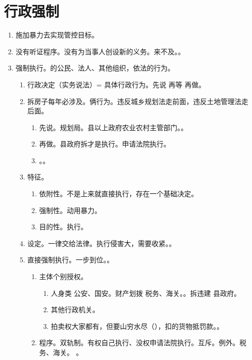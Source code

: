 \section{行政强制}
\begin{enumerate}
  \item 施加暴力去实现管控目标。
  \item 没有听证程序。\yi 没有为当事人创设新的义务。\er 来不及。。
  \item 强制执行。的公民、法人、其他组织，依法的行为。
        \begin{enumerate}
          \item 行政决定（实务说法）= 具体行政行为。先说 \yjt 再等 \yjt 再做。
          \item 拆房子每年必涉及。俩行为。违反城乡规划法走前面，违反土地管理法走后面。
                \begin{enumerate}
                  \item 先说。规划局。县以上政府农业农村主管部门。。
                  \item 再做。县政府拆才是执行。申请法院执行。
                  \item {}。。
                \end{enumerate}
          \item 特征。
                \begin{enumerate}
                  \item 依附性。不是上来就直接执行，存在一个基础决定。
                  \item 强制性。动用暴力。
                  \item 目的性。执行。
                \end{enumerate}
          \item 设定。一律交给法律。执行侵害大，需要收紧。。
          \item 直接强制执行。一步到位。。
                \begin{enumerate}
                  \item 主体个别授权。
                        \begin{enumerate}
                          \item 人身类 \yjt 公安、国安。财产划拨 \yjt 税务、海关。。拆违建 \yjt 县政府。
                          \item 其他行政机关。
                          \item 拍卖权大家都有，但要山穷水尽（），扣的货物抵罚款。。
                        \end{enumerate}
                  \item 程序。双轨制。有权自己执行、没权申请法院执行。互斥。例外。税务、海关。
                        。
                \end{enumerate}


\end{enumerate}
\end{enumerate}
